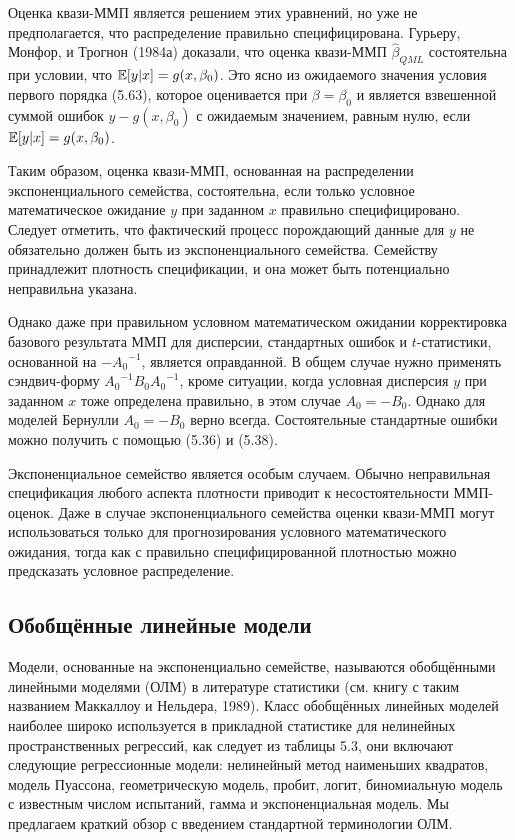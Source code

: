 Оценка квази-ММП является решением этих уравнений, но уже не предполагается, что распределение правильно специфицирована. Гурьеру, Монфор, и Трогнон (1984а) доказали, что оценка квази-ММП $\hat{\beta}_{QML}$ состоятельна при условии, что $\mathbb{E}[y|x]=g(x,\beta_0)$. Это ясно из ожидаемого значения условия первого порядка (5.63), которое оценивается при $\beta=\beta_0$ и является взвешенной суммой ошибок $y-g(x,\beta_0)$ с ожидаемым значением, равным нулю, если $\mathbb{E}[y|x]=g(x,\beta_0)$.

Таким образом, оценка квази-ММП, основанная на распределении экспоненциального семейства, состоятельна, если только условное математическое ожидание $y$ при заданном $x$ правильно специфицировано. Следует отметить, что фактический процесс порождающий данные для $y$ не обязательно должен быть из экспоненциального семейства. Семейству принадлежит плотность спецификации, и она может быть потенциально неправильна указана.

Однако даже при правильном условном математическом ожидании корректировка базового результата ММП для дисперсии, стандартных ошибок и $t$-статистики, основанной на $-{A_0}^{-1}$, является оправданной. В общем случае нужно применять сэндвич-форму ${A_0}^{-1}B_0{A_0}^{-1}$, кроме ситуации, когда условная дисперсия $y$ при заданном $x$ тоже определена правильно, в этом случае $A_0=-B_0$. Однако для моделей Бернулли $A_0=-B_0$ верно всегда. Состоятельные стандартные ошибки можно получить с помощью (5.36) и (5.38).

Экспоненциальное семейство является особым случаем. Обычно неправильная спецификация любого аспекта плотности приводит к несостоятельности ММП-оценок. Даже в случае экспоненциального семейства оценки квази-ММП могут использоваться только для прогнозирования условного математического ожидания, тогда как с правильно специфицированной плотностью можно предсказать условное распределение.

\subsection{Обобщённые линейные модели}

Модели, основанные на экспоненциально семействе, называются обобщёнными линейными моделями (ОЛМ) в литературе статистики (см. книгу с таким названием Маккаллоу и Нельдера, 1989). Класс обобщённых линейных моделей наиболее широко используется в прикладной статистике для нелинейных пространственных регрессий, как следует из таблицы 5.3, они включают следующие регрессионные модели: нелинейный метод наименьших квадратов, модель Пуассона, геометрическую модель, пробит, логит, биномиальную модель с известным числом испытаний, гамма и экспоненциальная модель. Мы предлагаем краткий обзор с введением стандартной терминологии ОЛМ.

